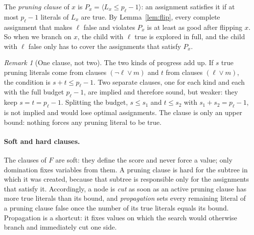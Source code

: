 \documentclass[11pt,a4paper]{article}
\theoremstyle{remark}
\newtheorem{remark}[theorem]{Remark}
\begin{document}
The \emph{pruning clause} of $x$ is $P_x=\langle L_x\le p_\ell-1\rangle$: an
assignment satisfies it if at most $p_\ell-1$ literals of $L_x$ are true. By
Lemma~\ref{lem:flip}, every complete assignment that makes $\ell$ false and
violates $P_x$ is at least as good after flipping $x$. So when we branch on $x$,
the child with $\ell$ true is explored in full, and the child with $\ell$ false
only has to cover the assignments that satisfy $P_x$.

\begin{remark}[One clause, not two]\label{rem:combined}
The two kinds of progress add up. If $s$ true pruning literals come from
clauses $(\neg\ell\lor m)$ and $t$ from clauses $(\ell\lor m)$, the condition is
$s+t\le p_\ell-1$. Two separate clauses, one for each kind and each with the
full budget $p_\ell-1$, are implied and therefore sound, but weaker: they keep
$s=t=p_\ell-1$. Splitting the budget, $s\le s_1$ and $t\le s_2$ with
$s_1+s_2=p_\ell-1$, is not implied and would lose optimal assignments. The
clause is only an upper bound: nothing forces any pruning literal to be true.
\end{remark}

\paragraph{Soft and hard clauses.} The clauses of $F$ are soft: they define the
score and never force a value; only domination fixes variables from them. A
pruning clause is hard for the subtree in which it was created, because that
subtree is responsible only for the assignments that satisfy it. Accordingly, a
node is \emph{cut} as soon as an active pruning clause has more true literals
than its bound, and \emph{propagation} sets every remaining literal of a
pruning clause false once the number of its true literals equals its bound.
Propagation is a shortcut: it fixes values on which the search would otherwise
branch and immediately cut one side.
\end{document}
